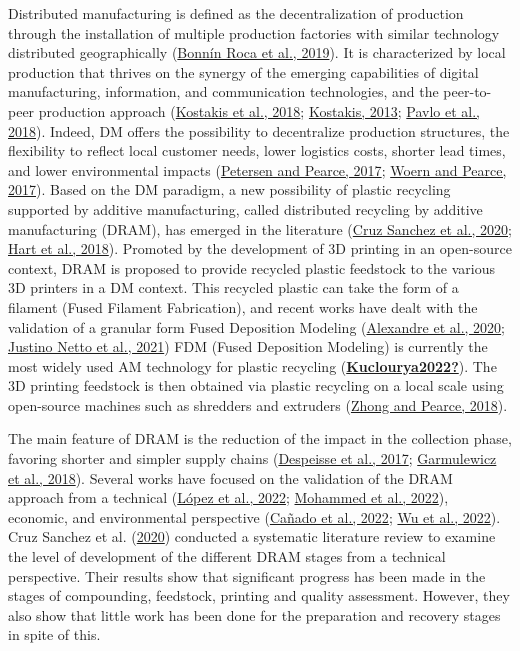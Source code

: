 \documentclass[12pt]{elsarticle} %
\begin{document}
Distributed manufacturing is defined as the decentralization of production through the installation of multiple production factories with similar technology distributed geographically (\protect\hyperlink{ref-BonninRoca2019}{Bonnín Roca et al., 2019}).
It is characterized by local production that thrives on the synergy of the emerging capabilities of digital manufacturing, information, and communication technologies, and the peer-to-peer production approach (\protect\hyperlink{ref-Kostakis2018}{Kostakis et al., 2018}; \protect\hyperlink{ref-Kostakis2013b}{Kostakis, 2013}; \protect\hyperlink{ref-Pavlo2018}{Pavlo et al., 2018}).
Indeed, DM offers the possibility to decentralize production structures, the flexibility to reflect local customer needs, lower logistics costs, shorter lead times, and lower environmental impacts (\protect\hyperlink{ref-Petersen2017a}{Petersen and Pearce, 2017}; \protect\hyperlink{ref-Woern2017}{Woern and Pearce, 2017}).
Based on the DM paradigm, a new possibility of plastic recycling supported by additive manufacturing, called distributed recycling by additive manufacturing (DRAM), has emerged in the literature (\protect\hyperlink{ref-CruzSanchez2020}{Cruz Sanchez et al., 2020}; \protect\hyperlink{ref-Hart2018}{Hart et al., 2018}).
Promoted by the development of 3D printing in an open-source context, DRAM is proposed to provide recycled plastic feedstock to the various 3D printers in a DM context.
This recycled plastic can take the form of a filament (Fused Filament Fabrication), and recent works have dealt with the validation of a granular form Fused Deposition Modeling (\protect\hyperlink{ref-Arthur2020}{Alexandre et al., 2020}; \protect\hyperlink{ref-JustinoNetto2021}{Justino Netto et al., 2021})
FDM (Fused Deposition Modeling) is currently the most widely used AM technology for plastic recycling (\protect\hyperlink{ref-Kuclourya2022}{\textbf{Kuclourya2022?}}).
The 3D printing feedstock is then obtained via plastic recycling on a local scale using open-source machines such as shredders and extruders (\protect\hyperlink{ref-Zhong2018}{Zhong and Pearce, 2018}).

The main feature of DRAM is the reduction of the impact in the collection phase, favoring shorter and simpler supply chains (\protect\hyperlink{ref-Despeisse2016}{Despeisse et al., 2017}; \protect\hyperlink{ref-Garmulewicz2018}{Garmulewicz et al., 2018}).
Several works have focused on the validation of the DRAM approach from a technical (\protect\hyperlink{ref-lopez2022}{López et al., 2022}; \protect\hyperlink{ref-Mohammed2022}{Mohammed et al., 2022}), economic, and environmental perspective (\protect\hyperlink{ref-canado2022}{Cañado et al., 2022}; \protect\hyperlink{ref-Wu2021a}{Wu et al., 2022}).
Cruz Sanchez et al. (\protect\hyperlink{ref-CruzSanchez2020}{2020}) conducted a systematic literature review to examine the level of development of the different DRAM stages from a technical perspective.
Their results show that significant progress has been made in the stages of compounding, feedstock, printing and quality assessment.
However, they also show that little work has been done for the preparation and recovery stages in spite of this.
\end{document}
